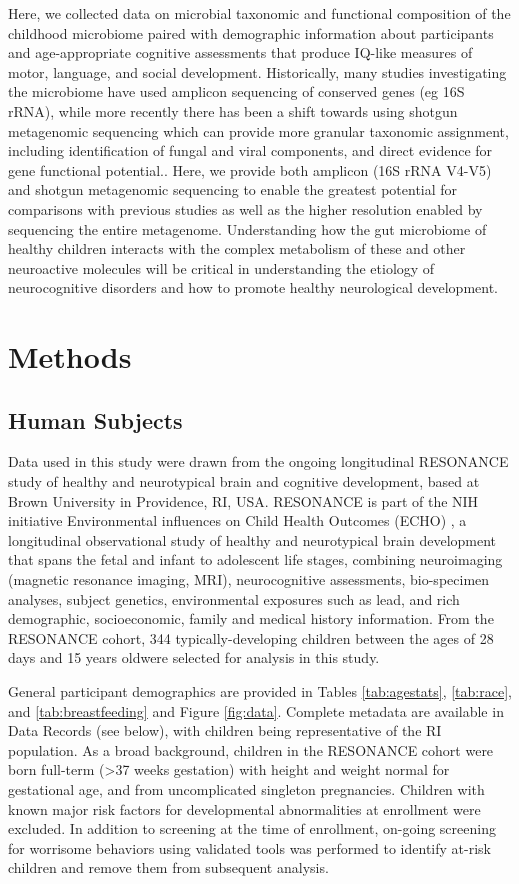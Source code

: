 \documentclass[fleqn,10pt]{wlscirep}
\begin{document}
Here, we collected data on microbial taxonomic and functional composition
of the childhood microbiome paired with demographic information about participants
and age-appropriate cognitive assessments that produce IQ-like measures of motor, language, and social development.
Historically, many studies investigating the microbiome have used amplicon sequencing of conserved genes (eg 16S rRNA),
while more recently there has been a shift towards using shotgun metagenomic sequencing
which can provide more granular taxonomic assignment, including identification of fungal and viral components,
and direct evidence for gene functional potential..
Here, we provide both amplicon (16S rRNA V4-V5) and shotgun metagenomic sequencing
to enable the greatest potential for comparisons with previous studies
as well as the higher resolution enabled by sequencing the entire metagenome.
Understanding how the gut microbiome of healthy children
interacts with the complex metabolism of these and other neuroactive molecules
will be critical in understanding the etiology of neurocognitive disorders
and how to promote healthy neurological development.



\section*{Methods}

\subsection*{Human Subjects}

Data used in this study were drawn from the ongoing longitudinal RESONANCE study
of healthy and neurotypical brain and cognitive development,
based at Brown University in Providence, RI, USA.
RESONANCE is part of the NIH initiative Environmental influences on Child Health Outcomes (ECHO) \cite{Forrest2018-ud,Gillman2018-om},
a longitudinal observational study of healthy and neurotypical brain development
that spans the fetal and infant to adolescent life stages,
combining neuroimaging (magnetic resonance imaging, MRI), neurocognitive assessments, bio-specimen analyses, subject genetics,
environmental exposures such as lead, and rich demographic, socioeconomic, family and medical history information.
From the RESONANCE cohort, 344 typically-developing children
between the ages of 28 days and 15 years oldwere selected for analysis in this study. 

General participant demographics are provided in Tables \ref{tab:agestats}, \ref{tab:race}, and \ref{tab:breastfeeding} and Figure \ref{fig:data}.
Complete metadata are available in Data Records (see below), with children being representative of the RI population.
As a broad background, children in the RESONANCE cohort were born full-term (>37 weeks gestation)
with height and weight normal for gestational age, and from uncomplicated singleton pregnancies.
Children with known major risk factors for developmental abnormalities at enrollment were excluded.
In addition to screening at the time of enrollment,
on-going screening for worrisome behaviors using validated tools was performed
to identify at-risk children and remove them from subsequent analysis.
\end{document}
